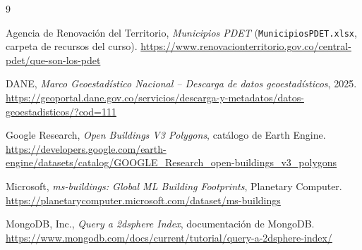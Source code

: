 \documentclass[11pt,a4paper]{article}
\begin{document}
\begin{thebibliography}{9}

Agencia de Renovación del Territorio, \emph{Municipios PDET}
(\texttt{MunicipiosPDET.xlsx}, carpeta de recursos del curso).
\url{https://www.renovacionterritorio.gov.co/central-pdet/que-son-los-pdet}

DANE, \emph{Marco Geoestadístico Nacional -- Descarga de datos
geoestadísticos}, 2025.
\url{https://geoportal.dane.gov.co/servicios/descarga-y-metadatos/datos-geoestadisticos/?cod=111}

Google Research, \emph{Open Buildings V3 Polygons}, catálogo de Earth Engine.
\url{https://developers.google.com/earth-engine/datasets/catalog/GOOGLE_Research_open-buildings_v3_polygons}

Microsoft, \emph{ms-buildings: Global ML Building Footprints}, Planetary
Computer.
\url{https://planetarycomputer.microsoft.com/dataset/ms-buildings}

MongoDB, Inc., \emph{Query a 2dsphere Index}, documentación de MongoDB.
\url{https://www.mongodb.com/docs/current/tutorial/query-a-2dsphere-index/}

\end{thebibliography}
\end{document}
